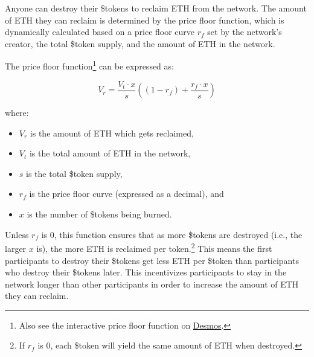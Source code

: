 \documentclass{article}
\begin{document}
Anyone can destroy their \$tokens to reclaim ETH from the network. The amount of ETH they can reclaim is determined by the price floor function, which is dynamically calculated based on a price floor curve $r_f$ set by the network's creator, the total \$token supply, and the amount of ETH in the network.

The price floor function\footnote{Also see the interactive price floor function on \href{https://www.desmos.com/calculator/9pewqesyj5}{Desmos}.} can be expressed as:

\begin{equation}
  V_r = \frac{V_t \cdot x}{s}\left(\left(1-r_f\right)+\frac{r_f \cdot x}{s}\right)
\end{equation}

where:
\begin{itemize}
  \item $V_r$ is the amount of ETH which gets reclaimed,
  \item $V_t$ is the total amount of ETH in the network,
  \item $s$ is the total \$token supply,
  \item $r_f$ is the price floor curve (expressed as a decimal), and
  \item $x$ is the number of \$tokens being burned.
\end{itemize}

Unless $r_f$ is 0, this function ensures that as more \$tokens are destroyed (i.e., the larger $x$ is), the more ETH is reclaimed per token.\footnote{If $r_f$ is 0, each \$token will yield the same amount of ETH when destroyed.} This means the first participants to destroy their \$tokens get less ETH per \$token than participants who destroy their \$tokens later. This incentivizes participants to stay in the network longer than other participants in order to increase the amount of ETH they can reclaim.
\end{document}
